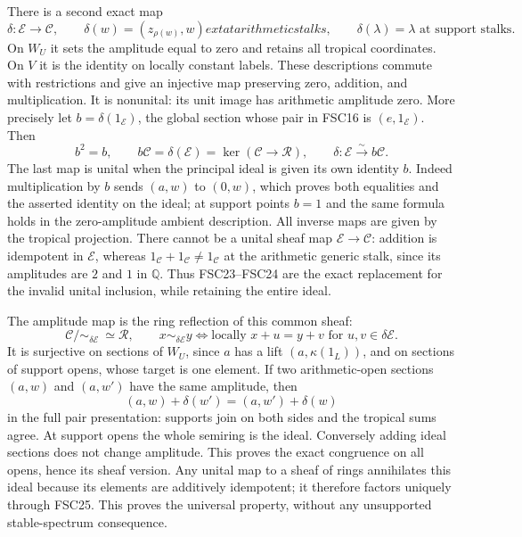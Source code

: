 There is a second exact map
\begin{equation}\tag{FSC23}
 \delta:\mathcal E\longrightarrow\mathcal C,\qquad
 \delta(w)=(z_{\rho(w)},w)	ext{ at arithmetic stalks},\qquad
 \delta(\lambda)=\lambda\text{ at support stalks}.
\end{equation}
On $W_U$ it sets the amplitude equal to zero and retains all tropical
coordinates. On $V$ it is the identity on locally constant labels.
These descriptions commute with restrictions and give an injective
map preserving zero, addition, and multiplication. It is nonunital:
its unit image has arithmetic amplitude zero. More precisely let
$b=\delta(1_{\mathcal E})$, the global section whose pair in FSC16 is
$(e,1_{\mathcal E})$. Then
\begin{equation}\tag{FSC24}
 b^2=b,\qquad
 b\mathcal C=\delta(\mathcal E)
          =\ker(\mathcal C\longrightarrow\mathcal R),\qquad
 \delta:\mathcal E\xrightarrow{\sim}b\mathcal C.
\end{equation}
The last map is unital when the principal ideal is given its own
identity $b$. Indeed multiplication by $b$ sends $(a,w)$ to $(0,w)$,
which proves both equalities and the asserted identity on the ideal;
at support points $b=1$ and the same formula holds in the zero-amplitude
ambient description. All inverse maps are given by the tropical
projection. There cannot be a unital sheaf map
$\mathcal E\to\mathcal C$: addition is idempotent in $\mathcal E$,
whereas $1_{\mathcal C}+1_{\mathcal C}\ne1_{\mathcal C}$ at the
arithmetic generic stalk, since its amplitudes are $2$ and $1$ in
$\mathbb Q$. Thus FSC23--FSC24 are the exact replacement for the
invalid unital inclusion, while retaining the entire ideal.

The amplitude map is the ring reflection of this common sheaf:
\begin{equation}\tag{FSC25}
 \mathcal C/\!\sim_{\delta\mathcal E}\ \simeq\mathcal R,
 \qquad x\sim_{\delta\mathcal E}y
 \iff \text{locally }x+u=y+v\text{ for }u,v\in\delta\mathcal E.
\end{equation}
It is surjective on sections of $W_U$, since $a$ has a lift
$(a,\kappa(1_L))$, and on sections of support opens, whose target is
one element. If two arithmetic-open sections $(a,w)$ and $(a,w')$
have the same amplitude, then
\[
 (a,w)+\delta(w')=(a,w')+\delta(w)
\]
in the full pair presentation: supports join on both sides and the
tropical sums agree. At support opens the whole semiring is the ideal.
Conversely adding ideal sections does not change amplitude. This
proves the exact congruence on all opens, hence its sheaf version.
Any unital map to a sheaf of rings annihilates this ideal because
its elements are additively idempotent; it therefore factors uniquely
through FSC25. This proves the universal property, without any
unsupported stable-spectrum consequence.

